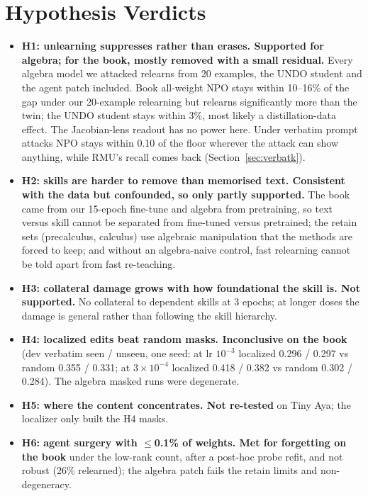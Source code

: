 \documentclass[10pt,twocolumn,letterpaper]{article}
\begin{document}
\section{Hypothesis Verdicts}

\begin{itemize}
\item \textbf{H1: unlearning suppresses rather than erases. Supported for algebra; for the book, mostly removed with a
small residual.} Every algebra model we attacked relearns from 20 examples, the UNDO student and the agent patch
included. Book all-weight NPO stays within 10--16\% of the gap under our 20-example relearning but relearns significantly
more than the twin; the UNDO student stays within 3\%, most likely a distillation-data effect.
The Jacobian-lens readout has no power here.
Under verbatim prompt attacks NPO stays within 0.10 of the floor wherever the attack can show anything, while RMU's
recall comes back (Section~\ref{sec:verbatk}).
\item \textbf{H2: skills are harder to remove than memorised text. Consistent with the data but confounded, so only partly
supported.} The book came from our 15-epoch fine-tune and algebra from pretraining, so text versus skill cannot be
separated from fine-tuned versus pretrained; the retain sets (precalculus, calculus) use algebraic manipulation that the
methods are forced to keep; and without an algebra-naive control, fast relearning cannot be told apart from fast
re-teaching.
\item \textbf{H3: collateral damage grows with how foundational the skill is. Not supported.} No collateral to dependent
skills at 3 epochs; at longer doses the damage is general rather than following the skill hierarchy.
\item \textbf{H4: localized edits beat random masks. Inconclusive on the book} (dev verbatim seen / unseen, one seed: at lr
$10^{-3}$ localized 0.296 / 0.297 vs random 0.355 / 0.331; at $3\times10^{-4}$ localized 0.418 / 0.382 vs random 0.302 /
0.284). The algebra masked runs were degenerate.
\item \textbf{H5: where the content concentrates. Not re-tested} on Tiny Aya; the localizer only built the H4 masks.
\item \textbf{H6: agent surgery with $\le$0.1\% of weights. Met for forgetting on the book} under the low-rank count, after a
post-hoc probe refit, and not robust (26\% relearned); the algebra patch fails the retain limits and non-degeneracy.
\end{itemize}
\end{document}
